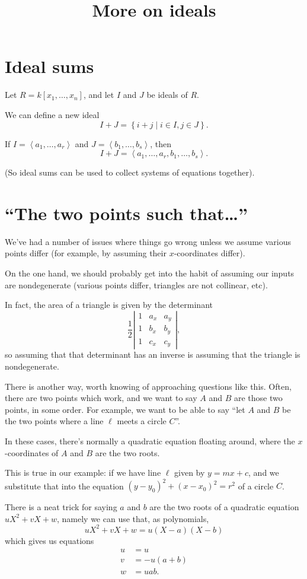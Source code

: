 \documentclass[a4paper, 14pt]{extarticle}
\title{More on ideals}
\begin{document}
\maketitle

\section{Ideal sums}

Let $R=k[x_1,\ldots,x_n]$, and let $I$ and $J$ be ideals of $R$.

We can define a new ideal
\[I+J=\left\{i+j\mid i\in I,j\in J\right\}.\]

If $I=\left<a_1,\ldots,a_r\right>$ and
$J=\left<b_1,\ldots,b_s\right>$, then
\[I+J=\left<a_1,\ldots,a_r,b_1,\ldots,b_s\right>.\]

(So ideal sums can be used to collect systems of equations together).

\section{``The two points such that\ldots''}

We've had a number of issues where things go wrong unless we assume
various points differ (for example, by assuming their $x$-coordinates
differ).

On the one hand, we should probably get into the habit of assuming our
inputs are nondegenerate (various points differ, triangles are not
collinear, etc).

In fact, the area of a triangle is given by the determinant
\begin{displaymath}
  \frac{1}{2}\left|\begin{matrix}
  1 & a_x & a_y\\
  1 & b_x & b_y\\
  1 & c_x & c_y
  \end{matrix}\right|,
\end{displaymath}
so assuming that that determinant has an inverse is assuming that the
triangle is nondegenerate.

There is another way, worth knowing of approaching questions like
this. Often, there are two points which work, and we want to say $A$
and $B$ are those two points, in some order. For example, we want to
be able to say ``let $A$ and $B$ be the two points where a line $\ell$
meets a circle $C$''.

In these cases, there's normally a quadratic equation floating around,
where the $x$-coordinates of $A$ and $B$ are the two roots.

This is true in our example: if we have line $\ell$ given by $y =
mx+c$, and we substitute that into the equation $(y-y_0)^2 + (x-x_0)^2
= r^2$ of a circle $C$.

There is a neat trick for saying $a$ and $b$ are the two roots of a
quadratic equation $uX^2 + vX + w$, namely we can use that, as
polynomials,
\[uX^2 + vX + w = u(X-a)(X-b)\]
which gives us equations
\begin{align*}
  u &= u\\
  v &= -u(a+b)\\
  w &= uab.
\end{align*}
\end{document}
